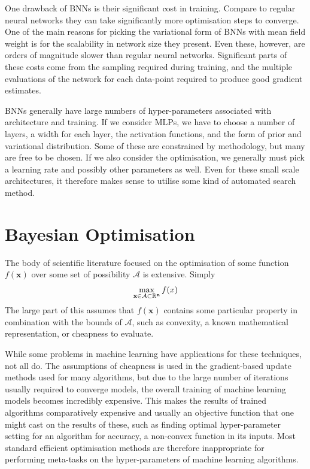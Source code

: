 One drawback of BNNs is their significant cost in training. Compare to regular neural networks they can take significantly more optimisation steps to converge. One of the main reasons for picking the variational form of BNNs with mean field weight is for the scalability in network size they present. Even these, however, are orders of magnitude slower than regular neural networks. Significant parts of these costs come from the sampling required during training, and the multiple evaluations of the network for each data-point required to produce good gradient estimates.

BNNs generally have large numbers of hyper-parameters associated with architecture and training. If we consider MLPs, we have to choose a number of layers, a width for each layer, the activation functions, and the form of prior and variational distribution. Some of these are constrained by methodology, but many are free to be chosen. If we also consider the optimisation, we generally must pick a learning rate and possibly other parameters as well. Even for these small scale architectures, it therefore makes sense to utilise some kind of automated search method.

\section{Bayesian Optimisation}
The body of scientific literature focused on the optimisation of some function \( f(\mathbf{x}) \) over some set of possibility \( \mathcal{A} \) is extensive. Simply
\begin{align}
	\max_{\mathbf{x \in \mathcal{A} \subset \mathbb{R}^n}} f(x)
\end{align}
The large part of this assumes that \( f(\mathbf{x}) \) contains some particular property in combination with the bounds of \( \mathcal{A} \), such as convexity, a known mathematical representation, or cheapness to evaluate. 

While some problems in machine learning have applications for these techniques, not all do. The assumptions of cheapness is used in the gradient-based update methods used for many algorithms, but due to the large number of iterations usually required to converge models, the overall training of machine learning models becomes incredibly expensive. This makes the results of trained algorithms comparatively expensive and usually an objective function that one might cast on the results of these, such as finding optimal hyper-parameter setting for an algorithm for accuracy, a non-convex function in its inputs. Most standard efficient optimisation methods are therefore inappropriate for performing meta-tasks on the hyper-parameters of machine learning algorithms.

